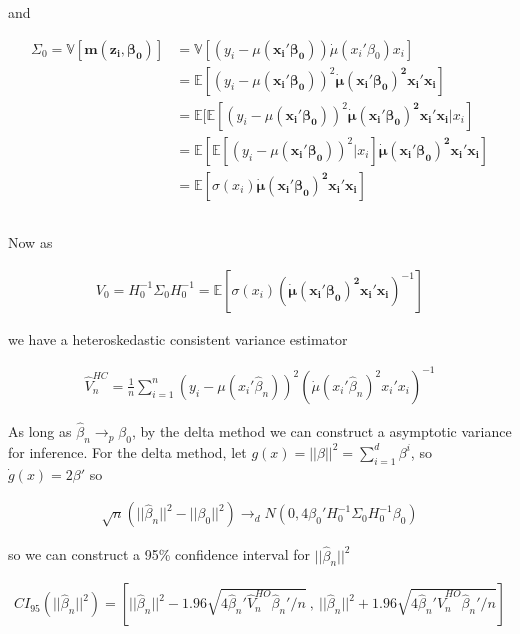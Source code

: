 \documentclass[12pt]{article}
\newcommand{\E}{\mathbb{E}}
\newcommand{\V}{\mathbb{V}}
\newcommand{\qsum}{\sum\limits_{i=1}^n}
\begin{document}
and

\begin{align*}
  \Sigma_0  = \V[\mathbf{m(z_i,\beta_0)}] &= \V[(y_i - \mu(\mathbf{x_i'\beta_0}))\dot{\mu}(x_i'\beta_0)x_i]\\
  &= \E[(y_i - \mu(\mathbf{x_i'\beta_0}))^2\mathbf{\dot{\mu}(x_i'\beta_0)^2x_i'x_i}]\\
  &= \E[\E[(y_i - \mu(\mathbf{x_i'\beta_0}))^2\mathbf{\dot{\mu}(x_i'\beta_0)^2x_i'x_i} |x_i]\\
  &= \E[\E[(y_i - \mu(\mathbf{x_i'\beta_0}))^2|x_i]\mathbf{\dot{\mu}(x_i'\beta_0)^2x_i'x_i}]\\
  &= \E[\sigma(x_i)\mathbf{\dot{\mu}(x_i'\beta_0)^2x_i'x_i}]
\end{align*}

\subsection{}

Now as


\begin{align*}
V_0 = H_0^{-1}\Sigma_0H_0^{-1} = \E[\sigma(x_i)(\mathbf{\dot{\mu}(x_i'\beta_0)^2x_i'x_i})^{-1}]
\end{align*}

we have a heteroskedastic consistent variance estimator

\begin{align*}
\hat{V}^{HC}_n = \frac{1}{n} \qsum (y_i - \mu(x_i'\hat\beta_n))^2 (\dot{\mu}(x_i'\hat\beta_n)^2x_i'x_i)^{-1}
\end{align*}


As long as $\hat\beta_n \rightarrow_p \beta_0$, by the delta method we can construct a asymptotic variance for inference. For the delta method, let $g(x) = || \beta || ^2 = \sum\limits_{i=1}^d \beta^i$, so $\dot g(x) = 2\beta'$ so

\begin{align*}
  \sqrt{n}(||\hat\beta_n||^2 - ||\beta_0||^2) \rightarrow_d N(0,4\beta_0'H_0^{-1}\Sigma_0H_0^{-1}\beta_0)
\end{align*}

so we can construct a 95\% confidence interval for $||\hat\beta_n||^2$

\begin{align*}
  CI_{95}\left( ||\hat\beta_n||^2 \right) = \left[||\hat\beta_n||^2  - 1.96\sqrt{4\hat\beta_n'\hat V^{HO}_n \hat\beta_n' / n} \ ,\ ||\hat\beta_n||^2  + 1.96\sqrt{4\hat\beta_n'\hat V^{HO}_n \hat\beta_n' / n} \right]
\end{align*}
\end{document}
